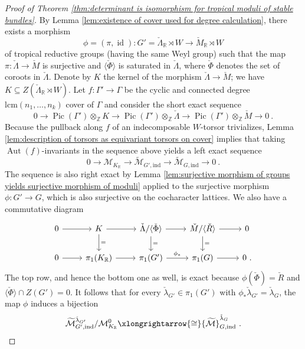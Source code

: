 \documentclass[10pt, a4paper]{amsart}
\theoremstyle{definition}
\theoremstyle{myitemstyle}
\newcommand{\R}{\mathbb{R}}
\newcommand{\Z}{\mathbb{Z}}
\newcommand{\Mcheck}{{\check{M}}}
\newcommand{\Lambdacheck}{\check{\Lambda}}
\newcommand{\lambdacheck}{\check{\lambda}}
\newcommand{\Rcheck}{\check{R}}
\newcommand{\Phicheck}{\check{\Phi}}
\newcommand{\mc}[1]{{\mathcal{#1}}}
\newcommand{\wmc}[1]{{\widetilde{\mathcal{#1}}}}
\DeclareMathOperator{\Pic}{Pic}
\DeclareMathOperator{\Aut}{Aut}
\DeclareMathOperator{\id}{id}
\newcommand{\ind}{\mathrm{ind}}
\begin{document}
\begin{proof}[Proof of Theorem \ref{thm:determinant is isomorphism for tropical moduli of stable bundles}]
By Lemma \ref{lem:existence of cover used for degree calculation}, there exists a morphism
\[
    \phi= (\pi, \id) \colon G'= \Lambdacheck_\R \rtimes W  \longrightarrow \Mcheck_\R \rtimes W
\]
of tropical reductive groups (having the same Weyl group) such that the map $\pi: \Lambdacheck\to\Mcheck$ is surjective and $\langle \Phicheck\rangle$ is saturated in $\Lambdacheck$, where $\Phicheck$ denotes the set of coroots in $\Lambdacheck$. Denote by $K$ the kernel of the morphism  $\Lambdacheck\to \Mcheck$; we have $K\subseteq Z(\Lambdacheck_\R \rtimes W)$. Let $f\colon \Gamma'\to \Gamma$ be the cyclic and connected degree $\mathrm{lcm}(n_1,\ldots,n_k)$ cover of $\Gamma$ and consider the short exact sequence
\[
    0 \longrightarrow
        \Pic(\Gamma')\otimes_\Z K \longrightarrow  
            \Pic(\Gamma')\otimes_\Z \Lambdacheck \longrightarrow
                \Pic(\Gamma')\otimes_\Z \Mcheck \longrightarrow
                    0 \ .
\]
Because the pullback along $f$ of an indecomposable $W$-torsor trivializes, Lemma \ref{lem:description of torsors as equivariant torsors on cover} implies that taking $\Aut(f)$-invariants in the sequence above yields a left exact sequence
\[
    0 \longrightarrow
        \mc M_{K_\R} \longrightarrow
            \wmc M_{G',\ind} \longrightarrow
                \wmc M_{G,\ind} \longrightarrow
                    0 \ .
\]
The sequence is also right exact by Lemma \ref{lem:surjective morphism of groups yields surjective morphism of moduli} applied to the surjective morphism $\phi: G' \to G$, which is also surjective on the cocharacter lattices. 
We also have a commutative diagram
\[
\begin{tikzcd}
    0 \arrow[r]&
        K \arrow[r]\arrow[d,"="] & 
            \Lambdacheck/\langle\Phicheck\rangle \arrow[r]\arrow[d,"="]&
                \Mcheck/\langle\Rcheck\rangle \arrow[r]\arrow[d,"="] &
                    0 \\
    0 \arrow[r] &
        \pi_1(K_\R) \arrow[r] & 
            \pi_1(G') \arrow[r,"\phi_*"] &
                \pi_1(G) \arrow[r] &
                    0 \ .
\end{tikzcd}
\]
The top row, and hence the bottom one as well, is exact because $\phi(\Phicheck)=\Rcheck$ and $\langle\Phicheck\rangle \cap Z(G')=0$.  It follows that for every $\lambdacheck_{G'}\in \pi_1(G')$ with $\phi_*\lambdacheck_{G'}=\lambdacheck_G$, the map $\phi$ induces a bijection
\[
    \wmc M^{\lambdacheck_{G'}}_{G',\ind}/\mc M^0_{K_\R} \xlongrightarrow{\cong} \wmc M^{\lambdacheck_G}_{G,\ind} \ .
\]
\end{proof}
\end{document}
